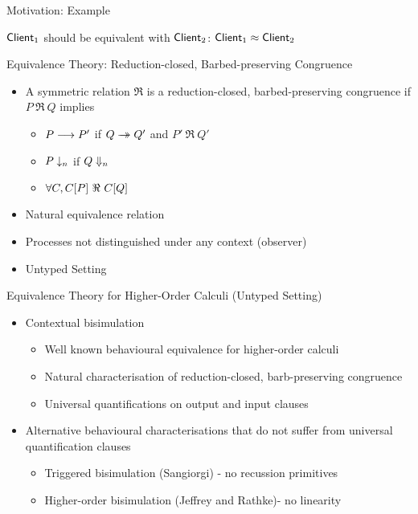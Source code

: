 \documentclass{beamer}
\begin{document}
	\begin{frame}{Motivation: Example}
		

		\vspace{5mm}
		$\mathsf{Client}_1$ should be equivalent with $\mathsf{Client}_2$: $\mathsf{Client}_1 \approx \mathsf{Client}_2$
	\end{frame}

	\begin{frame}{Equivalence Theory: Reduction-closed, Barbed-preserving Congruence}
		\begin{itemize}
			\item	A symmetric relation $\Re$ is  a reduction-closed, barbed-preserving congruence
				if $P\ \Re\ Q$ implies
				\begin{itemize}
					\item	$P \longrightarrow P'$ if $Q \rightarrow\!\!\!\!\!\rightarrow Q'$ and $P'\ \Re\ Q'$
					\item	$P \downarrow_{n}$ if $Q \Downarrow_{n}$
					\item	$\forall C, \context{C}{P}\ \Re\ \context{C}{Q}$
				\end{itemize}

			\item	Natural equivalence relation
			\item	Processes not distinguished under any context (observer)
			\item	Untyped Setting
		\end{itemize}
	\end{frame}


	\begin{frame}{Equivalence Theory for Higher-Order Calculi (Untyped Setting)}
		\begin{itemize}
			\item	Contextual bisimulation
				\begin{itemize}
					\item	Well known behavioural equivalence for higher-order calculi
					\item	Natural characterisation of reduction-closed, barb-preserving congruence
					\item	Universal quantifications on output and input clauses
				\end{itemize}


			\item	Alternative behavioural characterisations that do not suffer from universal quantification clauses
				\begin{itemize}
					\item	Triggered bisimulation (Sangiorgi) - no recussion primitives
					\item	Higher-order bisimulation (Jeffrey and Rathke)- no linearity
				\end{itemize}
		\end{itemize}
	\end{frame}
\end{document}
